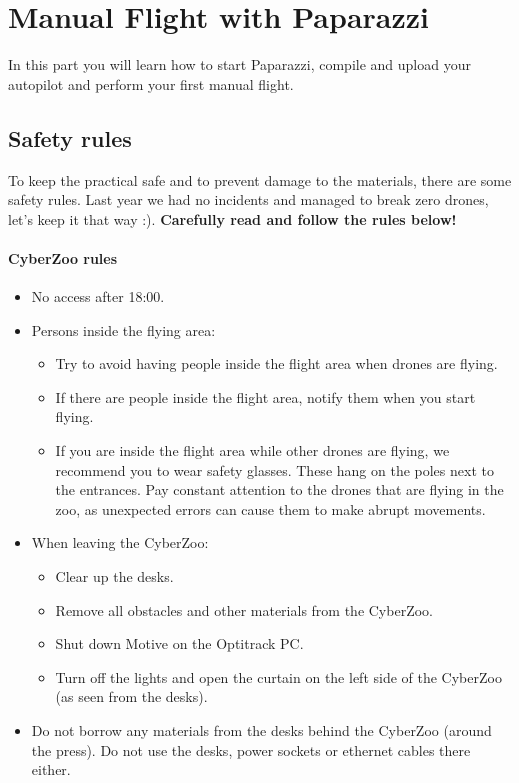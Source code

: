 \chapter{Manual Flight with Paparazzi}
\label{ch:manual_flight}
In this part you will learn how to start Paparazzi, compile and upload your autopilot and perform your first manual flight.

\section{Safety rules}
To keep the practical safe and to prevent damage to the materials, there are some safety rules.
Last year we had no incidents and managed to break zero drones, let's keep it that way :).
\textbf{Carefully read and follow the rules below!}

\subsubsection*{CyberZoo rules}
\begin{itemize}
	\item No access after 18:00.
	\item Persons inside the flying area:
	\begin{itemize}
		\item Try to avoid having people inside the flight area when drones are flying.
		\item If there are people inside the flight area, notify them when you start flying.
		\item If you are inside the flight area while other drones are flying, we recommend you to wear safety glasses. These hang on the poles next to the entrances. Pay constant attention to the drones that are flying in the zoo, as unexpected errors can cause them to make abrupt movements.
	\end{itemize}
	\item When leaving the CyberZoo:
	\begin{itemize}
		\item Clear up the desks.
		\item Remove all obstacles and other materials from the CyberZoo.
		\item Shut down Motive on the Optitrack PC.
		\item Turn off the lights and open the curtain on the left side of the CyberZoo (as seen from the desks).
	\end{itemize}
	\item Do not borrow any materials from the desks behind the CyberZoo (around the press). Do not use the desks, power sockets or ethernet cables there either.
\end{itemize}


